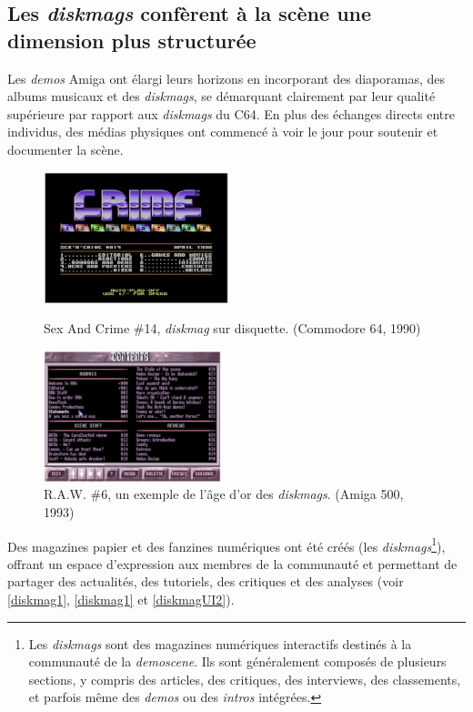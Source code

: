 \subsection*{Les \textit{diskmags} confèrent à la scène une dimension plus structurée}

Les \textit{demos} Amiga ont élargi leurs horizons en incorporant des diaporamas, des albums musicaux et des \textit{diskmags}, se démarquant clairement par leur qualité supérieure par rapport aux \textit{diskmags} du C64. En plus des échanges directs entre individus, des médias physiques ont commencé à voir le jour pour soutenir et documenter la scène. 

\begin{figure}[h]
  \begin{minipage}[b]{0.45\linewidth}
    \centering
    \includegraphics[width=\linewidth, height=1.5in]{images/demoscene/demos/diskmag1.png}
    \caption{Sex And Crime \#14, \textit{diskmag} sur disquette. (Commodore 64, 1990)}
    \label{diskmag1}
  \end{minipage}
  \hspace{0.1\linewidth} %
  \begin{minipage}[b]{0.45\linewidth}
    \centering
    \includegraphics[width=\linewidth, height=1.5in]{images/demoscene/demos/diskmag2.png}
    \caption{R.A.W. \#6, un exemple de l'âge d'or des \textit{diskmags}. (Amiga 500, 1993)}
    \label{diskmag2}
  \end{minipage}
\end{figure}

Des magazines papier et des fanzines numériques ont été créés (les \textit{diskmags}\footnote{Les \textit{diskmags} sont des magazines numériques interactifs destinés à la communauté de la \textit{demoscene}. Ils sont généralement composés de plusieurs sections, y compris des articles, des critiques, des interviews, des classements, et parfois 
même des \textit{demos} ou des \textit{intros} intégrées.}), offrant un espace d'expression aux membres de la communauté et permettant de partager des actualités, des tutoriels, des critiques et des analyses (voir \ref{diskmag1}, \ref{diskmag1} et \ref{diskmagUI2}). 

